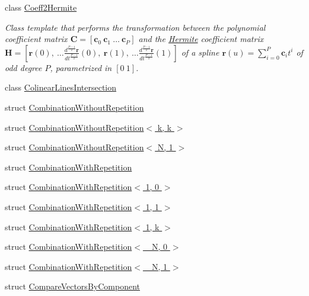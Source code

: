 \begin{DoxyCompactItemize}
\item 
class \hyperlink{classmodel_1_1_coeff2_hermite}{Coeff2\+Hermite}
\begin{DoxyCompactList}\small\item\em Class template that performs the transformation between the polynomial coefficient matrix $ \mathbf{C}=\left[\mathbf{c}_0\ \mathbf{c}_1\ \ldots \ \mathbf{c}_P\right]$ and the \hyperlink{classmodel_1_1_hermite}{Hermite} coefficient matrix $ \mathbf{H}=\left[\mathbf{r}(0),\ \ldots \frac{d^\frac{P-1}{2}\mathbf{r}}{dt^\frac{P-1}{2}}(0),\ \mathbf{r}(1),\ \ldots \frac{d^\frac{P-1}{2}\mathbf{r}}{dt^\frac{P-1}{2}}(1)\right]$ of a spline $\mathbf{r}(u)=\sum_{i=0}^P\mathbf{c}_it^i$ of odd degree $P$, parametrized in $[0\ 1]$. \end{DoxyCompactList}\item 
class \hyperlink{classmodel_1_1_colinear_lines_intersection}{Colinear\+Lines\+Intersection}
\item 
struct \hyperlink{structmodel_1_1_combination_without_repetition}{Combination\+Without\+Repetition}
\item 
struct \hyperlink{structmodel_1_1_combination_without_repetition_3_01k_00_01k_01_4}{Combination\+Without\+Repetition$<$ k, k $>$}
\item 
struct \hyperlink{structmodel_1_1_combination_without_repetition_3_01_n_00_011_01_4}{Combination\+Without\+Repetition$<$ N, 1 $>$}
\item 
struct \hyperlink{structmodel_1_1_combination_with_repetition}{Combination\+With\+Repetition}
\item 
struct \hyperlink{structmodel_1_1_combination_with_repetition_3_011_00_010_01_4}{Combination\+With\+Repetition$<$ 1, 0 $>$}
\item 
struct \hyperlink{structmodel_1_1_combination_with_repetition_3_011_00_011_01_4}{Combination\+With\+Repetition$<$ 1, 1 $>$}
\item 
struct \hyperlink{structmodel_1_1_combination_with_repetition_3_011_00_01k_01_4}{Combination\+With\+Repetition$<$ 1, k $>$}
\item 
struct \hyperlink{structmodel_1_1_combination_with_repetition_3_01___n_00_010_01_4}{Combination\+With\+Repetition$<$ \+\_\+\+N, 0 $>$}
\item 
struct \hyperlink{structmodel_1_1_combination_with_repetition_3_01___n_00_011_01_4}{Combination\+With\+Repetition$<$ \+\_\+\+N, 1 $>$}
\item 
struct \hyperlink{structmodel_1_1_compare_vectors_by_component}{Compare\+Vectors\+By\+Component}

\end{DoxyCompactItemize}
